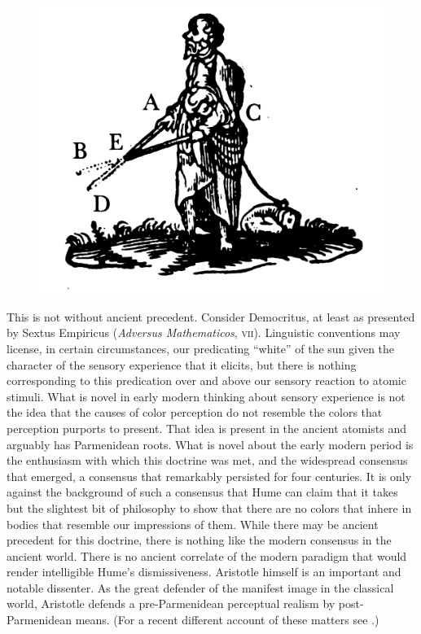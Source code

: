 \begin{figure}[htbp]
	\centering
		\includegraphics[scale=2]{graphics/blind.jpeg}
	\caption{\citealt{Descartes:1637uq}}
	\label{fig:blind}
\end{figure}

This is not without ancient precedent. Consider Democritus, at least as presented by Sextus Empiricus (\emph{Adversus Mathematicos}, \textsc{vii}). Linguistic conventions may license, in certain circumstances, our predicating ``white'' of the sun given the character of the sensory experience that it elicits, but there is nothing corresponding to this predication over and above our sensory reaction to atomic stimuli. What is novel in early modern thinking about sensory experience is not the idea that the causes of color perception do not resemble the colors that perception purports to present. That idea is present in the ancient atomists and arguably has Parmenidean roots. What is novel about the early modern period is the enthusiasm with which this doctrine was met, and the widespread consensus that emerged, a consensus that remarkably persisted for four centuries. It is only against the background of such a consensus that Hume can claim that it takes but the slightest bit of philosophy to show that there are no colors that inhere in bodies that resemble our impressions of them. While there may be ancient precedent for this doctrine, there is nothing like the modern consensus in the ancient world. There is no ancient correlate of the modern paradigm that would render intelligible Hume's dismissiveness. Aristotle himself is an important and notable dissenter. As the great defender of the manifest image in the classical world, Aristotle defends a pre-Parmenidean perceptual realism by post-Parmenidean means. (For a recent different account of these matters see \citealt{Lee:2011ys}.)


